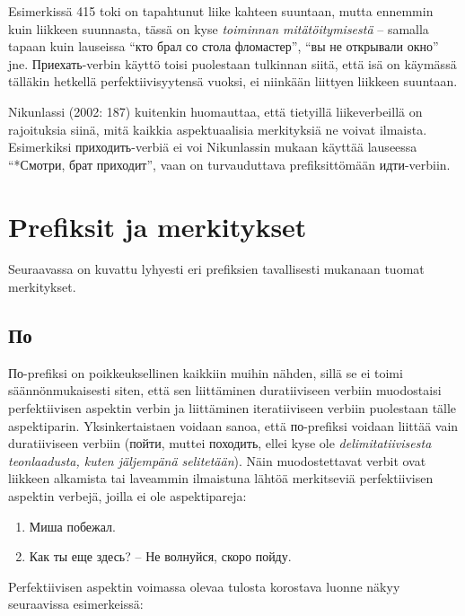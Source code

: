 \documentclass[]{scrreprt}
\providecommand{\tightlist}{%
  \setlength{\itemsep}{0pt}\setlength{\parskip}{0pt}}
\begin{document}
Esimerkissä 415 toki on tapahtunut liike kahteen suuntaan, mutta
ennemmin kuin liikkeen suunnasta, tässä on kyse \emph{toiminnan
mitätöitymisestä} -- samalla tapaan kuin lauseissa ``кто брал со стола
фломастер'', ``вы не открывали окно'' jne. Приехать-verbin käyttö toisi
puolestaan tulkinnan siitä, että isä on käymässä tälläkin hetkellä
perfektiivisyytensä vuoksi, ei niinkään liittyen liikkeen suuntaan.

Nikunlassi (2002: 187) kuitenkin huomauttaa, että tietyillä
liikeverbeillä on rajoituksia siinä, mitä kaikkia aspektuaalisia
merkityksiä ne voivat ilmaista. Esimerkiksi приходить-verbiä ei voi
Nikunlassin mukaan käyttää lauseessa ``*Смотри, брат приходит'', vaan on
turvauduttava prefiksittömään идти-verbiin.

\section{Prefiksit ja merkitykset}\label{prefiksit-ja-merkitykset}

Seuraavassa on kuvattu lyhyesti eri prefiksien tavallisesti mukanaan
tuomat merkitykset.

\subsection{По}\label{ux43fux43e}

По-prefiksi on poikkeuksellinen kaikkiin muihin nähden, sillä se ei
toimi säännönmukaisesti siten, että sen liittäminen duratiiviseen
verbiin muodostaisi perfektiivisen aspektin verbin ja liittäminen
iteratiiviseen verbiin puolestaan tälle aspektiparin. Yksinkertaistaen
voidaan sanoa, että по-prefiksi voidaan liittää vain duratiiviseen
verbiin (пойти, muttei походить, ellei kyse ole \emph{delimitatiivisesta
teonlaadusta, kuten jäljempänä selitetään}). Näin muodostettavat verbit
ovat liikkeen alkamista tai laveammin ilmaistuna lähtöä merkitseviä
perfektiivisen aspektin verbejä, joilla ei ole aspektipareja:

\begin{enumerate}
\def\labelenumi{(\arabic{enumi})}
\setcounter{enumi}{415}
\tightlist
\item
  Миша побежал.
\item
  Как ты еще здесь? -- Не волнуйся, скоро пойду.
\end{enumerate}

Perfektiivisen aspektin voimassa olevaa tulosta korostava luonne näkyy
seuraavissa esimerkeissä:
\end{document}
